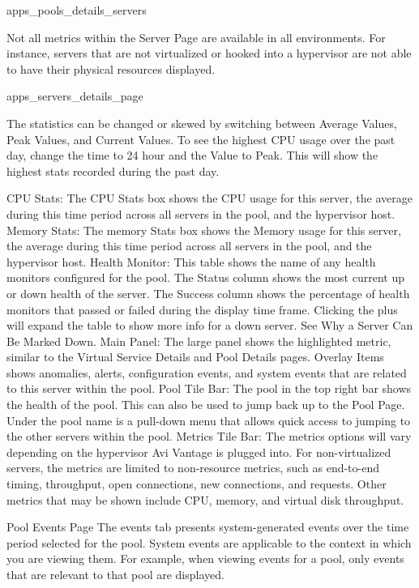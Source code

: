 \documentclass[letterpaper,10pt,english]{sphinxmanual}
\begin{document}
apps\_pools\_details\_servers

Not all metrics within the Server Page are available in all environments. For instance, servers that are not virtualized or hooked into a hypervisor are not able to have their physical resources displayed.

apps\_servers\_details\_page

The statistics can be changed or skewed by switching between Average Values, Peak Values, and Current Values. To see the highest CPU usage over the past day, change the time to 24 hour and the Value to Peak. This will show the highest stats recorded during the past day.

CPU Stats: The CPU Stats box shows the CPU usage for this server, the average during this time period across all servers in the pool, and the hypervisor host.
Memory Stats: The memory Stats box shows the Memory usage for this server, the average during this time period across all servers in the pool, and the hypervisor host.
Health Monitor: This table shows the name of any health monitors configured for the pool. The Status column shows the most current up or down health of the server. The Success column shows the percentage of health monitors that passed or failed during the display time frame. Clicking the plus will expand the table to show more info for a down server. See Why a Server Can Be Marked Down.
Main Panel: The large panel shows the highlighted metric, similar to the Virtual Service Details and Pool Details pages. Overlay Items shows anomalies, alerts, configuration events, and system events that are related to this server within the pool.
Pool Tile Bar: The pool in the top right bar shows the health of the pool. This can also be used to jump back up to the Pool Page. Under the pool name is a pull-down menu that allows quick access to jumping to the other servers within the pool.
Metrics Tile Bar: The metrics options will vary depending on the hypervisor Avi Vantage is plugged into. For non-virtualized servers, the metrics are limited to non-resource metrics, such as end-to-end timing, throughput, open connections, new connections, and requests. Other metrics that may be shown include CPU, memory, and virtual disk throughput.

Pool Events Page
The events tab presents system-generated events over the time period selected for the pool. System events are applicable to the context in which you are viewing them. For example, when viewing events for a pool, only events that are relevant to that pool are displayed.
\end{document}
